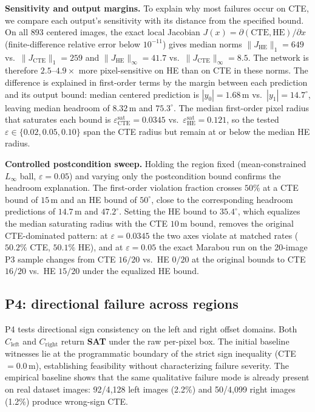 \documentclass[twocolumn,smallextended,runningheads]{svjour3}
\begin{document}
\textbf{Sensitivity and output margins.} To explain why most failures occur on CTE, we compare each output's sensitivity with its distance from the specified bound. On all 893 centered images, the exact local Jacobian $J(x)=\partial(\mathrm{CTE},\mathrm{HE})/\partial x$ (finite-difference relative error below $10^{-11}$) gives median norms $\|J_{\mathrm{HE}}\|_1=649$ vs.\ $\|J_{\mathrm{CTE}}\|_1=259$ and $\|J_{\mathrm{HE}}\|_\infty=41.7$ vs.\ $\|J_{\mathrm{CTE}}\|_\infty=8.5$. The network is therefore $2.5$--$4.9\times$ more pixel-sensitive on HE than on CTE in these norms. The difference is explained in first-order terms by the margin between each prediction and its output bound: median centered prediction is $|y_0|=1.68$\,m vs.\ $|y_1|=14.7^\circ$, leaving median headroom of $8.32$\,m and $75.3^\circ$. The median first-order pixel radius that saturates each bound is $\varepsilon_{\mathrm{CTE}}^{\mathrm{sat}}=0.0345$ vs.\ $\varepsilon_{\mathrm{HE}}^{\mathrm{sat}}=0.121$, so the tested $\varepsilon \in \{0.02,0.05,0.10\}$ span the CTE radius but remain at or below the median HE radius.

\textbf{Controlled postcondition sweep.} Holding the region fixed (mean-constrained $L_\infty$ ball, $\varepsilon{=}0.05$) and varying only the postcondition bound confirms the headroom explanation. The first-order violation fraction crosses $50\%$ at a CTE bound of $15$\,m and an HE bound of $50^\circ$, close to the corresponding headroom predictions of $14.7$\,m and $47.2^\circ$. Setting the HE bound to $35.4^\circ$, which equalizes the median saturating radius with the CTE $10$\,m bound, removes the original CTE-dominated pattern: at $\varepsilon{=}0.0345$ the two axes violate at matched rates ($50.2\%$ CTE, $50.1\%$ HE), and at $\varepsilon{=}0.05$ the exact Marabou run on the 20-image P3 sample changes from CTE $16/20$ vs.\ HE $0/20$ at the original bounds to CTE $16/20$ vs.\ HE $15/20$ under the equalized HE bound.

\subsection{P4: directional failure across regions}
\label{sec:probe_p4}
\label{sec:p4_results}

P4 tests directional sign consistency on the left and right offset domains. Both $C_\text{left}$ and $C_\text{right}$ return \textbf{SAT} under the raw per-pixel box. The initial baseline witnesses lie at the programmatic boundary of the strict sign inequality (CTE $=0.0$\,m), establishing feasibility without characterizing failure severity. The empirical baseline shows that the same qualitative failure mode is already present on real dataset images: 92/4{,}128 left images (2.2\%) and 50/4{,}099 right images (1.2\%) produce wrong-sign CTE.
\end{document}
